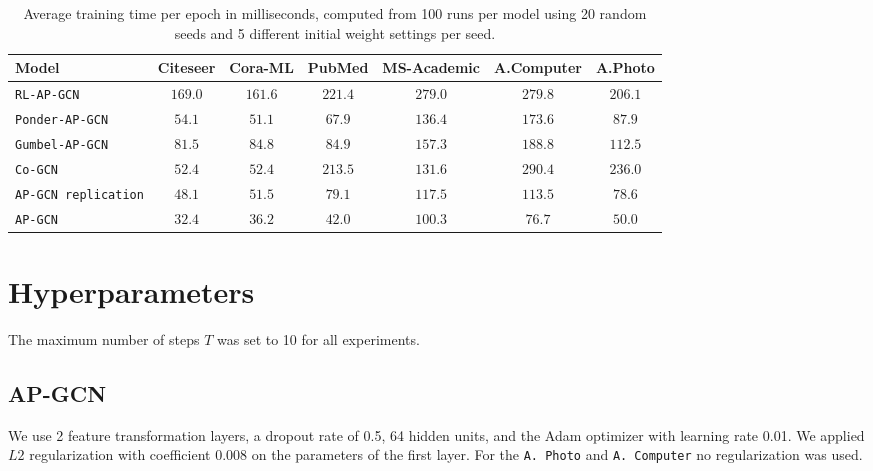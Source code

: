 \documentclass{gdl}
\begin{document}
\begin{table}[h]
    \small\sf\centering
    \caption{Average training time per epoch in milliseconds, computed from 100 runs per model using 20 random seeds and 5 different initial weight settings per seed.}
    \begin{tabular}{l c c c c c c}
        \toprule
        Model & Citeseer & Cora-ML & PubMed & MS-Academic & A.Computer & A.Photo   \\
        \midrule
        \texttt{RL-AP-GCN} &$169.0$&$161.6$&$221.4$&$279.0$&$279.8$&$206.1$  \\
        \texttt{Ponder-AP-GCN} &$54.1$&$51.1$&$67.9$&$136.4$&$173.6$&$87.9$   \\
        \texttt{Gumbel-AP-GCN} &$81.5$&$84.8$&$84.9$&$157.3$&$188.8$&$112.5$   \\
        \texttt{Co-GCN} &$52.4$&$52.4$&$213.5$&$131.6$&$290.4$&$236.0$  \\
        \texttt{AP-GCN replication} &$48.1$&$51.5$&$79.1$&$117.5$&$113.5$&$78.6$  \\
        \midrule
        \texttt{AP-GCN} & $32.4$ & $36.2$ & $42.0$ & $100.3$ & $76.7$ & $50.0$ \\
        \bottomrule 
    \end{tabular}
    \label{tab:time-per-epoch}
\end{table}

\newpage
\twocolumn




\clearpage


\clearpage

\appendix

\section{Hyperparameters}
The maximum number of steps $T$ was set to 10 for all experiments.

\subsection{AP-GCN}
\label{lab:hyper-ap-gcn}
We use 2 feature transformation layers, a dropout rate of 0.5, 64 hidden units, and the Adam optimizer with learning rate 0.01. We applied $L2$ regularization with coefficient 0.008 on the parameters of the first layer. For the \texttt{A. Photo} and \texttt{A. Computer} no regularization was used.
\end{document}
